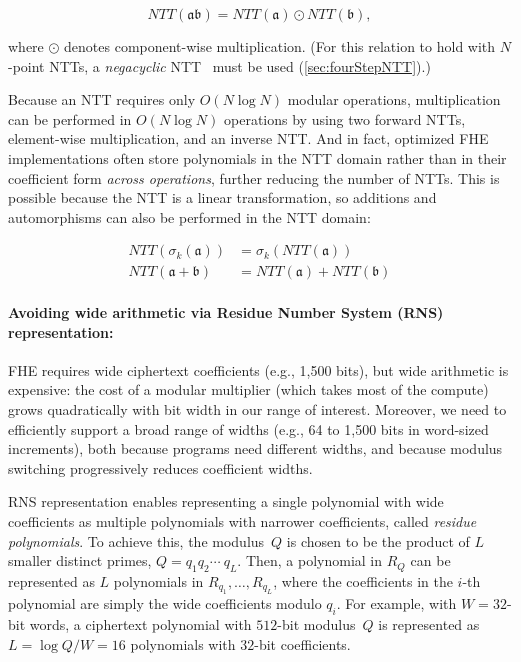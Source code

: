 \begin{equation*}
    NTT(\mathfrak{a}\mathfrak{b}) = NTT(\mathfrak{a}) \odot NTT(\mathfrak{b}),
\end{equation*}

where $\odot$ denotes component-wise multiplication. (For this relation to hold
with $N$\hyp{}point NTTs, a \emph{negacyclic}
NTT~\cite{lyubashevsky:tact10:ideal} must be used (\autoref{sec:fourStepNTT}).)

Because an NTT requires only $O(N \log N)$ modular operations, multiplication
can be performed in $O(N \log N)$ operations by using two forward NTTs,
element-wise multiplication, and an inverse NTT. And in fact, optimized FHE
implementations often store polynomials in the NTT domain rather than in their
coefficient form \emph{across operations}, further reducing the number of NTTs.
This is possible because the NTT is a linear transformation, so additions and
automorphisms can also be performed in the NTT domain:

\begin{align*}
    NTT(\sigma_k(\mathfrak{a})) &= \sigma_k(NTT(\mathfrak{a})) \\
    NTT(\mathfrak{a} + \mathfrak{b}) &= NTT(\mathfrak{a}) + NTT(\mathfrak{b})
\end{align*}

\paragraph{Avoiding wide arithmetic via Residue Number System (RNS) representation:}
FHE requires wide ciphertext coefficients (e.g., 1,500 bits), but wide
arithmetic is expensive: the cost of a modular multiplier (which takes most of
the compute) grows quadratically with bit width in our range of interest.
Moreover, we need to efficiently support a broad range of widths (e.g., 64 to
1,500 bits in word-sized increments), both because programs need different
widths, and because modulus switching progressively reduces coefficient widths.

RNS representation \cite{garner:1959:residue} enables representing a single
polynomial with wide coefficients as multiple polynomials with narrower
coefficients, called \emph{residue polynomials}. To achieve this, the
modulus~$Q$  is chosen to be the product of $L$ smaller distinct primes, $Q =
q_1q_2\cdots\ q_L$. Then, a polynomial in $R_Q$ can be represented as $L$
polynomials in $R_{q_1}, \ldots, R_{q_L}$, where the coefficients in the $i$-th
polynomial are simply the wide coefficients modulo $q_i$. For example, with $W
= 32$-bit words, a ciphertext polynomial with $512$-bit modulus~$Q$ is
represented as $L = \log Q/W = 16$ polynomials with $32$-bit coefficients.

